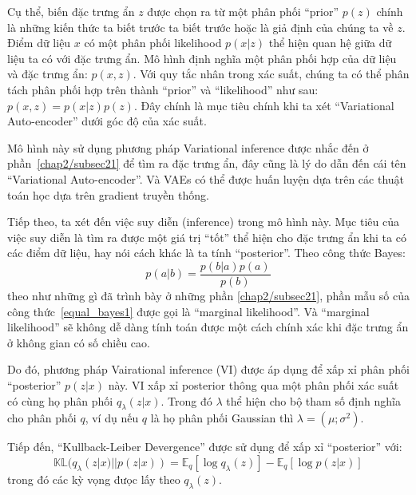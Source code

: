         Cụ thể, biến đặc trưng ẩn $z$ được chọn ra từ một phân phối ``prior'' $p(z)$ chính là những kiến thức ta biết trước ta biết trước hoặc là giả định của chúng ta về $z$. Điểm dữ liệu $x$ có một phân phối likelihood $p(x|z)$ thể hiện quan hệ giữa dữ liệu ta có với đặc trưng ẩn.
        Mô hình định nghĩa một phân phối hợp của dữ liệu và đặc trưng ẩn: $p(x,z)$. 
        Với quy tắc nhân trong xác suất, chúng ta có thể phân tách phân phối hợp trên thành ``prior'' và ``likelihood'' như sau: $p(x,z) = p(x|z)p(z)$. Đây chính là mục tiêu chính khi ta xét ``Variational Auto-encoder'' dưới góc độ của xác suất.


        Mô hình này sử dụng phương pháp Variational inference được nhắc đến ở phần~\ref{chap2/subsec21} để tìm ra đặc trưng ẩn, đây cũng là lý do dẫn đến cái tên ``Variational Auto-encoder''. Và VAEs có thể được huấn luyện dựa trên các thuật toán  học dựa trên gradient truyền thống.
        
        
        Tiếp theo, ta xét đến việc suy diễn (inference) trong mô hình này. 
        Mục tiêu của việc suy diễn là tìm ra được một giá trị ``tốt'' thể hiện cho đặc trưng ẩn khi ta có các điểm dữ liệu, hay nói cách khác là ta tính ``posterior''.
        Theo công thức Bayes:
        \begin{equation}
        \label{equal_bayes1}
            p(a|b) = \frac{p(b|a)p(a)}{p(b)}
        \end{equation}
        theo như những gì đã trình bày ở những phần \ref{chap2/subsec21}, phần mẫu số 
        của công thức~\ref{equal_bayes1} được gọi là ``marginal likelihood''. 
        Và ``marginal likelihood'' sẽ không dễ dàng tính toán được một cách chính xác khi đặc trưng ẩn ở không gian có số chiều cao. 

        Do đó, phương pháp Vairational inference (VI) được áp dụng để xấp xỉ phân phối ``posterior'' $p(z|x)$ này.
        VI xấp xỉ posterior thông qua một phân phối xác suất có cùng họ phân phối $q_\lambda(z|x)$.
        Trong đó $\lambda$ thể hiện cho bộ tham số định nghĩa cho phân phối $q$, ví dụ nếu $q$ là  họ phân phối Gaussian thì $\lambda = (\mu;\sigma^2)$.
        
        Tiếp đến, ``Kullback-Leiber Devergence'' được sử dụng để xấp xỉ ``posterior'' 
        với:
        \begin{equation}
        \label{KLD1}
            \mathbb{KL}(q_\lambda(z|x) || p (z|x)) = \mathbb{E}_q[\log q_\lambda(z)] - \mathbb{E}_q[\log p(z|x)]
        \end{equation}
        trong đó các kỳ vọng đưọc lấy theo $q_\lambda(z)$.
        
